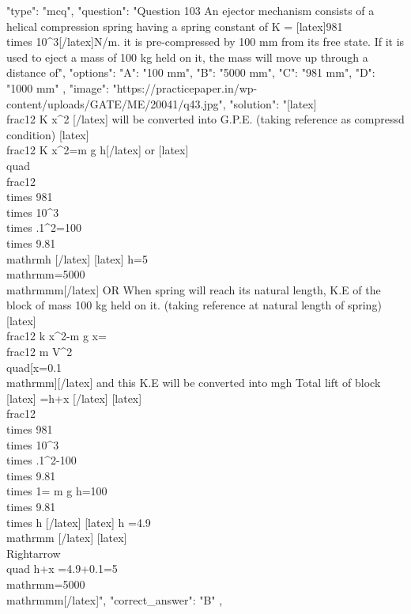   {
    "type": "mcq",
    "question": "Question 103 An ejector mechanism consists of a helical compression spring having a spring constant of K = [latex]981\\times 10^{3}[/latex]\n N/m. it is pre-compressed by 100 mm from its free state. If it is used to eject a mass of 100 kg held on it, the mass will move up through a distance of",
    "options": {
      "A": "100 mm",
      "B": "5000 mm",
      "C": "981 mm",
      "D": "1000 mm"
    },
    "image": "https://practicepaper.in/wp-content/uploads/GATE/ME/20041/q43.jpg",
    "solution": "[latex]\\frac{1}{2} K x^{2} [/latex] will be converted into G.P.E. (taking reference as compressd condition) [latex] \\frac{1}{2} K x^{2}=m g h[/latex] or  [latex] \\quad \\frac{1}{2} \\times 981 \\times 10^{3} \\times .1^{2}=100 \\times 9.81 \\mathrm{h} [/latex] [latex] h=5 \\mathrm{m}=5000 \\mathrm{mm}[/latex] OR When spring will reach its natural length, K.E of the block of mass 100 kg held on it.  (taking reference at natural length of spring) [latex] \\frac{1}{2} k x^{2}-m g x=\\frac{1}{2} m V^{2} \\quad[x=0.1 \\mathrm{m}][/latex] and this K.E will be converted into mgh Total lift of block [latex] =h+x [/latex] [latex] \\frac{1}{2} \\times 981 \\times 10^{3} \\times .1^{2}-100 \\times 9.81 \\times 1= m g h=100 \\times 9.81 \\times h [/latex] [latex] h =4.9 \\mathrm{m} [/latex] [latex] \\Rightarrow \\quad h+x =4.9+0.1=5 \\mathrm{m}=5000 \\mathrm{mm}[/latex]",
    "correct_answer": "B"
  },
